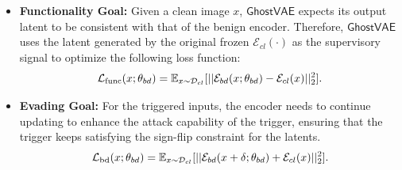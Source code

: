 \documentclass[letterpaper,twocolumn,10pt]{article}
\newcommand{\mg}{$\mathsf{GhostVAE}$\xspace}
\begin{document}
\begin{itemize}

\item \textbf{Functionality Goal: }
Given a clean image $x$, \mg expects its output latent to be consistent with that of the benign encoder. 
Therefore, \mg uses the latent generated by the original frozen $\mathcal{E}_{cl}(\cdot)$ as the supervisory signal to optimize the following loss function:
\begin{equation*}
\mathcal{L}_{\rm func}(x;\theta_{bd})=
\mathbb{E}_{x\sim\mathcal{D}_{cl}}
[||\mathcal{E}_{bd}(x;\theta_{bd}) - \mathcal{E}_{cl}(x)||_2^2].
\end{equation*}

\item \textbf{Evading Goal: }For the triggered inputs, the encoder needs to continue updating to enhance the attack capability of the trigger, ensuring that the trigger keeps satisfying the sign-flip constraint for the latents.
\begin{equation*}
\mathcal{L}_{\rm bd}(x;\theta_{bd})=
\mathbb{E}_{x\sim\mathcal{D}_{cl}}
[||\mathcal{E}_{bd}(x+\delta;\theta_{bd}) + \mathcal{E}_{cl}(x)||_2^2].
\end{equation*}


\end{itemize}
\end{document}
